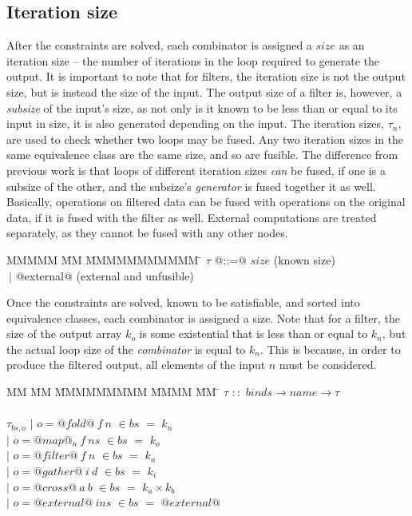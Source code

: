 \subsection{Iteration size}
After the constraints are solved, each combinator is assigned a $size$ as an iteration size -- the number of iterations in the loop required to generate the output.
It is important to note that for filters, the iteration size is not the output size, but is instead the size of the input.
The output size of a filter is, however, a \emph{subsize} of the input's size, as not only is it known to be less than or equal to its input in size, it is also generated depending on the input.
The iteration sizes, $\tau_n$, are used to check whether two loops may be fused.
Any two iteration sizes in the same equivalence class are the same size, and so are fusible.
The difference from previous work is that loops of different iteration sizes \emph{can} be fused, if one is a subsize of the other, and the subsize's \emph{generator} is fused together it as well.
Basically, operations on filtered data can be fused with operations on the original data, if it is fused with the filter as well.
External computations are treated separately, as they cannot be fused with any other nodes.

\begin{tabbing}
MMMMM       \= MM \= MMMMMMMMMMM \= \kill
$\tau$       \> @::=@ \> $size$                                  \> (known size) \\
             \> $~|$  \> @external@                              \> (external and unfusible) \\
\end{tabbing}

Once the constraints are solved, known to be satisfiable, and sorted into equivalence classes, each combinator is assigned a size.
Note that for a filter, the size of the output array $k_o$ is some existential that is less than or equal to $k_n$, but the actual loop size of the \emph{combinator} is equal to $k_n$.
This is because, in order to produce the filtered output, all elements of the input $n$ must be considered.


\begin{tabbing}
MM \= MM \= MMMMMMMMM \= MMMM \= MM \= \kill
$\tau$  \>$::$\> $binds \rightarrow name \rightarrow \tau$ \\
\\
$\tau_{bs,o}$    
            \> $|$ \> $o = @fold@~f~n$      \> $\in bs$ \> $=$ \> $k_n$ \\
            \> $|$ \> $o = @map@_n~f~ns$    \> $\in bs$ \> $=$ \> $k_o$ \\
            \> $|$ \> $o = @filter@~f~n$    \> $\in bs$ \> $=$ \> $k_n$ \\
            \> $|$ \> $o = @gather@~i~d$    \> $\in bs$ \> $=$ \> $k_i$ \\
            \> $|$ \> $o = @cross@~a~b$     \> $\in bs$ \> $=$ \> $k_a \times k_b$ \\
            \> $|$ \> $o = @external@~ins$  \> $\in bs$ \> $=$ \> $@external@$ \\
\end{tabbing}

